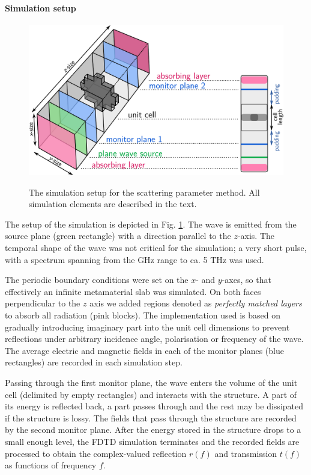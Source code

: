 \paragraph{Simulation setup} %
\begin{figure}[ht] \centering \caption{The simulation setup for the scattering parameter method. All simulation elements are described in the text.
} \includegraphics[width=12cm]{img/meep_geometry.pdf}  \label{fg_fdtd_sparam} \end{figure} %
The setup of the simulation is depicted in Fig. \ref{fg_fdtd_sparam}. The wave is emitted from the source plane (green rectangle) with a direction parallel to the $z$-axis. The temporal shape of the wave was not critical for the simulation; a very short pulse, with a spectrum spanning from the GHz range to ca. 5 THz was used. 

The periodic boundary conditions were set on the $x$- and $y$-axes, so that effectively an infinite metamaterial slab was simulated. On both faces perpendicular to the $z$ axis we added regions denoted as \textit{perfectly matched layers} \cite{oskooi2011distinguishing} to absorb all radiation (pink blocks). The implementation used is based on gradually introducing imaginary part into the unit cell dimensions to prevent reflections under arbitrary incidence angle, polarisation or frequency of the wave.
The average electric and magnetic fields in each of the monitor planes (blue rectangles) are recorded  in each simulation step.  

Passing through the first monitor plane, the wave enters the volume of the unit cell (delimited by empty rectangles) and interacts with the structure. A part of its energy is reflected back, a part passes through and the rest may be dissipated if the structure is lossy. The fields that pass through the structure are recorded by the second monitor plane. After the energy stored in the structure drops to a small enough level, the FDTD simulation terminates and the recorded fields are processed to obtain the complex-valued reflection $r(f)$ and transmission $t(f)$ as functions of frequency $f$. %

